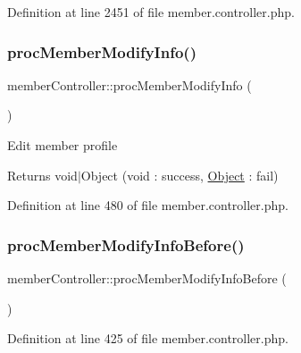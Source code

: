 Definition at line 2451 of file member.\+controller.\+php.

\hypertarget{classmemberController_abe0dc1c6680e07a0189e53a10a7651f2}{}\label{classmemberController_abe0dc1c6680e07a0189e53a10a7651f2} 
\subsubsection{\texorpdfstring{proc\+Member\+Modify\+Info()}{procMemberModifyInfo()}}
{\footnotesize\ttfamily member\+Controller\+::proc\+Member\+Modify\+Info (\begin{DoxyParamCaption}{ }\end{DoxyParamCaption})}

Edit member profile

\begin{DoxyReturn}{Returns}
void$\vert$\+Object (void \+: success, \hyperlink{classObject}{Object} \+: fail) 
\end{DoxyReturn}


Definition at line 480 of file member.\+controller.\+php.

\hypertarget{classmemberController_ac7a79ff38569abb383495b4d796eba69}{}\label{classmemberController_ac7a79ff38569abb383495b4d796eba69} 
\subsubsection{\texorpdfstring{proc\+Member\+Modify\+Info\+Before()}{procMemberModifyInfoBefore()}}
{\footnotesize\ttfamily member\+Controller\+::proc\+Member\+Modify\+Info\+Before (\begin{DoxyParamCaption}{ }\end{DoxyParamCaption})}



Definition at line 425 of file member.\+controller.\+php.

\hypertarget{classmemberController_ae62edfe1a880c94c02fba4c04b22add3}{}\label{classmemberController_ae62edfe1a880c94c02fba4c04b22add3} 
